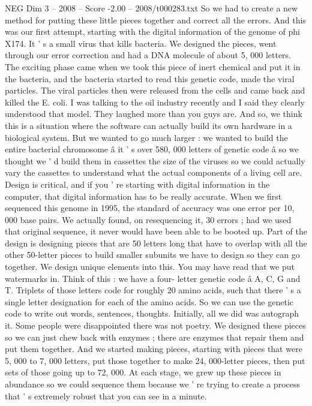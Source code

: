 \begin{textsample}{NEG Dim 3 – 2008 – Score -2.00 – 2008/t000283.txt}
So we had to create a new method for putting these little pieces together and correct all the errors.
And this was our first attempt, starting with the digital information of the genome of phi X174.
It ' s a small virus that kills bacteria.
We designed the pieces, went through our error correction and had a DNA molecule of about 5, 000 letters.
The exciting phase came when we took this piece of inert chemical and put it in the bacteria, and the bacteria started to read this genetic code, made the viral particles.
The viral particles then were released from the cells and came back and killed the E. coli.
I was talking to the oil industry recently and I said they clearly understood that model.
They laughed more than you guys are.
And so, we think this is a situation where the software can actually build its own hardware in a biological system.
But we wanted to go much larger : we wanted to build the entire bacterial chromosome â it ' s over 580, 000 letters of genetic code â so we thought we ' d build them in cassettes the size of the viruses so we could actually vary the cassettes to understand what the actual components of a living cell are.
Design is critical, and if you ' re starting with digital information in the computer, that digital information has to be really accurate.
When we first sequenced this genome in 1995, the standard of accuracy was one error per 10, 000 base pairs.
We actually found, on resequencing it, 30 errors ; had we used that original sequence, it never would have been able to be booted up.
Part of the design is designing pieces that are 50 letters long that have to overlap with all the other 50-letter pieces to build smaller subunits we have to design so they can go together.
We design unique elements into this.
You may have read that we put watermarks in.
Think of this : we have a four- letter genetic code â A, C, G and T.
Triplets of those letters code for roughly 20 amino acids, such that there ' s a single letter designation for each of the amino acids.
So we can use the genetic code to write out words, sentences, thoughts.
Initially, all we did was autograph it.
Some people were disappointed there was not poetry.
We designed these pieces so we can just chew back with enzymes ; there are enzymes that repair them and put them together.
And we started making pieces, starting with pieces that were 5, 000 to 7, 000 letters, put those together to make 24, 000-letter pieces, then put sets of those going up to 72, 000.
At each stage, we grew up these pieces in abundance so we could sequence them because we ' re trying to create a process that ' s extremely robust that you can see in a minute.

\end{textsample}
